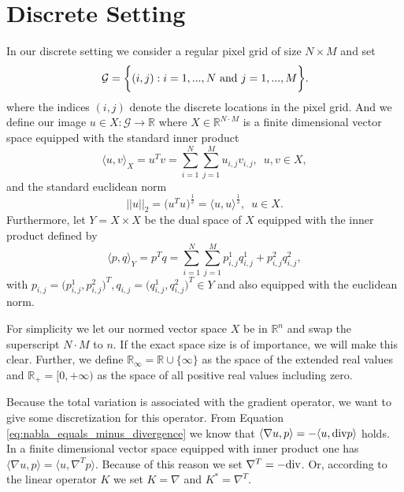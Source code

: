 \section{Discrete Setting} %
\label{sec:discrete_setting}

    In our discrete setting we consider a regular pixel grid of size $N \times M$ and set
        \begin{equation}
            \mathcal{G} = \bigg\{ (i, j) : i = 1, ..., N \,\, \textnormal{and} \,\, j = 1, ..., M \bigg\}.
            \label{eq:pixel_grid}
        \end{equation}
    where the indices $(i, j)$ denote the discrete locations in the pixel grid. And we define our image $u \in X: \mathcal{G} \longrightarrow \mathbb{R}$ where $X \in \mathbb{R}^{N \cdot M}$ is a finite dimensional vector space equipped with the standard inner product
        \begin{equation}
            \langle u, v \rangle_{X} = u^{T}v = \sum_{i = 1}^{N} \sum_{j = 1}^{M} u_{i, j} v_{i, j}, \,\,\, u, v \in X,
            \label{eq:inner_product}
        \end{equation}
    and the standard euclidean norm
        $$
            ||u||_{2} = \big( u^{T} u \big)^{\frac{1}{2}} = \langle u, u \rangle^{\frac{1}{2}}, \,\,\, u \in X.
        $$
    Furthermore, let $Y = X \times X$ be the dual space of $X$ equipped with the inner product defined by
        $$
            \langle p, q \rangle_{Y} = p^{T}q = \sum_{i = 1}^{N} \sum_{j = 1}^{M} p^{1}_{i, j} q^{1}_{i, j} + p^{2}_{i, j} q^{2}_{i, j},
        $$
    with $p_{i, j} = \big(p^{1}_{i, j}, p^{2}_{i, j}\big)^{T}, q_{i, j} = \big(q^{1}_{i, j}, q^{2}_{i, j}\big)^{T} \in Y$ and also equipped with the euclidean norm.

    For simplicity we let our normed vector space $X$ be in $\mathbb{R}^{n}$ and swap the superscript $N \cdot M$ to $n$. If the exact space size is of importance, we will make this clear. Further, we define $\mathbb{R}_{\infty} = \mathbb{R} \cup \{\infty\}$ as the space of the extended real values and $\mathbb{R}_{+} = [0, +\infty)$ as the space of all positive real values including zero.

    Because the total variation is associated with the gradient operator, we want to give some discretization for this operator. From Equation \ref{eq:nabla_equals_minus_divergence} we know that $\langle \nabla u, p \rangle = - \langle u, \textnormal{div}p \rangle$ holds. In a finite dimensional vector space equipped with inner product one has $\langle \nabla u, p \rangle = \langle u, \nabla^{T} p \rangle$. Because of this reason we set $\nabla^{T} = -\textnormal{div}$. Or, according to the linear operator $K$ we set $K = \nabla$ and $K^{\ast} = \nabla^{T}$.

